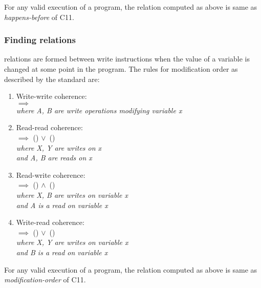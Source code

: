 \begin{lemma} For any valid execution of a program, the relation \setHB computed 
	as above is same as \emph{happens-before} of C11.
\end{lemma}

\subsubsection{Finding \setMO relations}
\setMO relations are formed between write instructions when the value of a 
variable is changed at some point in the program. The rules for modification 
order as described by the standard \cite{C11} are:
\begin{enumerate}
    \item Write-write coherence: \\
     $\implies$ \\
    \textit{where A, B are write operations modifying variable x}
    
    \item Read-read coherence:\\
     $\implies$ () $\lor$\ ()\\
    \textit{where X, Y are writes on x\\ and A, B are reads on x}
    
    \item Read-write coherence:\\
     $\implies$ () $\land$\ ()\\
    \textit{where X, B are writes on variable x\\and A is a read on variable x}
    
    \item Write-read coherence:\\
     $\implies$ () $\lor$\ ()\\
    \textit{where X, Y are writes on variable x\\and B is a read on variable x}
\end{enumerate}

\begin{lemma}
	For any valid execution of a program, the relation \setMO computed 
	as above is same as \emph{modification-order} of C11.
\end{lemma}

